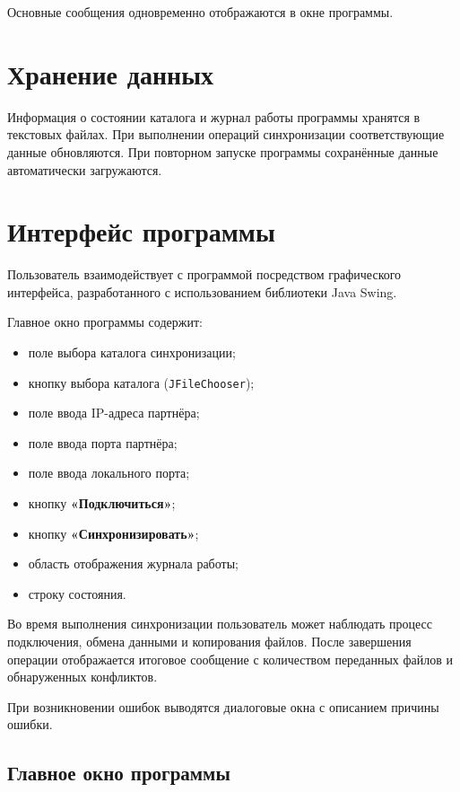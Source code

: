 \documentclass[12pt,a4paper]{article}
\begin{document}
Основные сообщения одновременно отображаются в окне программы.

\section{Хранение данных}

Информация о состоянии каталога и журнал работы программы хранятся в текстовых файлах. При выполнении операций синхронизации соответствующие данные обновляются. При повторном запуске программы сохранённые данные автоматически загружаются.

\section{Интерфейс программы}

Пользователь взаимодействует с программой посредством графического интерфейса, разработанного с использованием библиотеки Java Swing.

Главное окно программы содержит:

\begin{itemize}[nosep]
    \item поле выбора каталога синхронизации;
    \item кнопку выбора каталога (\texttt{JFileChooser});
    \item поле ввода IP-адреса партнёра;
    \item поле ввода порта партнёра;
    \item поле ввода локального порта;
    \item кнопку \textbf{«Подключиться»};
    \item кнопку \textbf{«Синхронизировать»};
    \item область отображения журнала работы;
    \item строку состояния.
\end{itemize}

Во время выполнения синхронизации пользователь может наблюдать процесс подключения, обмена данными и копирования файлов. После завершения операции отображается итоговое сообщение с количеством переданных файлов и обнаруженных конфликтов.

При возникновении ошибок выводятся диалоговые окна с описанием причины ошибки.

\subsection*{Главное окно программы}
\end{document}
